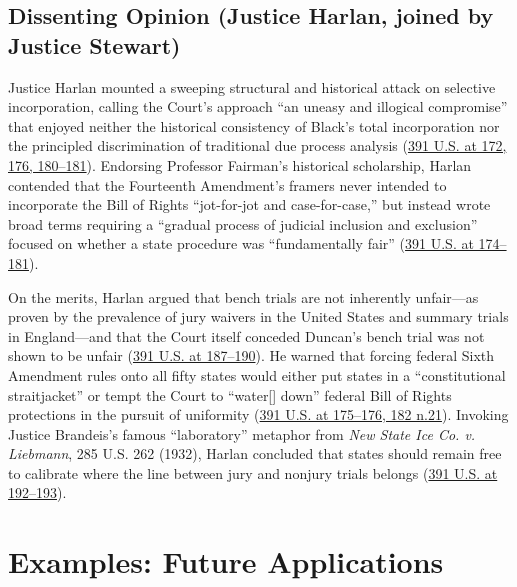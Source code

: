 \documentclass[12pt]{article}
\begin{document}
\subsection{Dissenting Opinion (Justice Harlan, joined by Justice Stewart)}

Justice Harlan mounted a sweeping structural and historical attack on selective incorporation, calling the Court's approach ``an uneasy and illogical compromise'' that enjoyed neither the historical consistency of Black's total incorporation nor the principled discrimination of traditional due process analysis (\href{https://supreme.justia.com/cases/federal/us/391/145/}{391 U.S. at 172, 176, 180--181}). Endorsing Professor Fairman's historical scholarship, Harlan contended that the Fourteenth Amendment's framers never intended to incorporate the Bill of Rights ``jot-for-jot and case-for-case,'' but instead wrote broad terms requiring a ``gradual process of judicial inclusion and exclusion'' focused on whether a state procedure was ``fundamentally fair'' (\href{https://supreme.justia.com/cases/federal/us/391/145/}{391 U.S. at 174--181}).

On the merits, Harlan argued that bench trials are not inherently unfair---as proven by the prevalence of jury waivers in the United States and summary trials in England---and that the Court itself conceded Duncan's bench trial was not shown to be unfair (\href{https://supreme.justia.com/cases/federal/us/391/145/}{391 U.S. at 187--190}). He warned that forcing federal Sixth Amendment rules onto all fifty states would either put states in a ``constitutional straitjacket'' or tempt the Court to ``water[] down'' federal Bill of Rights protections in the pursuit of uniformity (\href{https://supreme.justia.com/cases/federal/us/391/145/}{391 U.S. at 175--176, 182 n.21}). Invoking Justice Brandeis's famous ``laboratory'' metaphor from \textit{New State Ice Co. v. Liebmann}, 285 U.S. 262 (1932), Harlan concluded that states should remain free to calibrate where the line between jury and nonjury trials belongs (\href{https://supreme.justia.com/cases/federal/us/391/145/}{391 U.S. at 192--193}).

\section{Examples: Future Applications}
\end{document}
